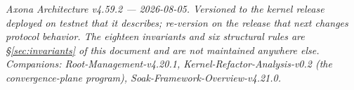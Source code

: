 \documentclass[nobib]{tufte-handout}
\begin{document}
\vspace{1.5em}
\noindent\textcolor{inkmuted}{\footnotesize\itshape
Axona Architecture v4.59.2 --- 2026-08-05. Versioned to the kernel
release deployed on testnet that it describes; re-version on the release
that next changes protocol behavior. The eighteen invariants and six
structural rules are \S\ref{sec:invariants} of this document and are not
maintained anywhere else. Companions: Root-Management-v4.20.1,
Kernel-Refactor-Analysis-v0.2 (the convergence-plane program),
Soak-Framework-Overview-v4.21.0.}
\end{document}
